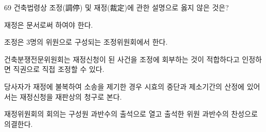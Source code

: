 \begin{question}{69}
건축법령상 조정(調停) 및 재정(裁定)에 관한 설명으로 옳지 않은 것은?
\begin{choices}
  \item 재정은 문서로써 하여야 한다.
  \item 조정은 3명의 위원으로 구성되는 조정위원회에서 한다.
  \item 건축분쟁전문위원회는 재정신청이 된 사건을 조정에 회부하는 것이 적합하다고 인정하면 직권으로 직접 조정할 수 있다.
  \item 당사자가 재정에 불복하여 소송을 제기한 경우 시효의 중단과 제소기간의 산정에 있어서는 재정신청을 재판상의 청구로 본다.
  \item 재정위원회의 회의는 구성원 과반수의 출석으로 열고 출석한 위원 과반수의 찬성으로 의결한다.
\end{choices}
\end{question}
